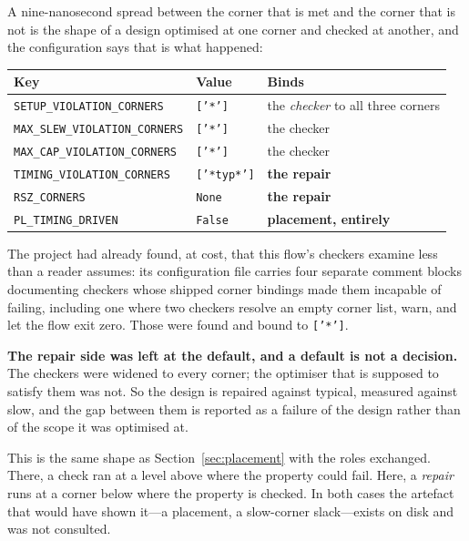 \documentclass[11pt,a4paper]{article}
\begin{document}
A nine-nanosecond spread between the corner that is met and the corner
that is not is the shape of a design optimised at one corner and checked
at another, and the configuration says that is what happened:

\begin{center}
\small
\begin{tabular}{lll}
\toprule
Key & Value & Binds \\
\midrule
\texttt{SETUP\_VIOLATION\_CORNERS} & \texttt{['*']} & the \emph{checker}
to all three corners \\
\texttt{MAX\_SLEW\_VIOLATION\_CORNERS} & \texttt{['*']} & the checker \\
\texttt{MAX\_CAP\_VIOLATION\_CORNERS} & \texttt{['*']} & the checker \\
\texttt{TIMING\_VIOLATION\_CORNERS} & \texttt{['*typ*']} &
\textbf{the repair} \\
\texttt{RSZ\_CORNERS} & \texttt{None} & \textbf{the repair} \\
\texttt{PL\_TIMING\_DRIVEN} & \texttt{False} &
\textbf{placement, entirely} \\
\bottomrule
\end{tabular}
\end{center}

The project had already found, at cost, that this flow's checkers examine
less than a reader assumes: its configuration file carries four separate
comment blocks documenting checkers whose shipped corner bindings made
them incapable of failing, including one where two checkers resolve an
empty corner list, warn, and let the flow exit zero. Those were found and
bound to \texttt{['*']}.

\textbf{The repair side was left at the default, and a default is not a
decision.} The checkers were widened to every corner; the optimiser that
is supposed to satisfy them was not. So the design is repaired against
typical, measured against slow, and the gap between them is reported as a
failure of the design rather than of the scope it was optimised at.

This is the same shape as Section~\ref{sec:placement} with the roles
exchanged. There, a check ran at a level above where the property could
fail. Here, a \emph{repair} runs at a corner below where the property is
checked. In both cases the artefact that would have shown it---a
placement, a slow-corner slack---exists on disk and was not consulted.
\end{document}
